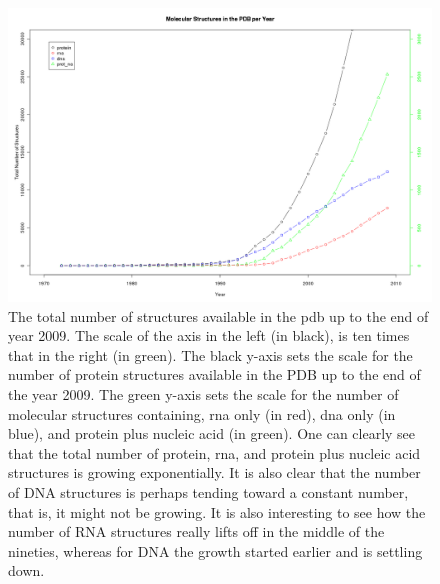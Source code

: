 \begin{figure}[t]
\centering
\includegraphics[angle=90, scale=0.5]{Supplement/allmolecules_per_year.png}
\caption{The total number of structures available in the pdb up to the
end of year 2009. The scale of the axis in the left (in black), is ten
times that in the right (in green). The black y-axis sets the scale
for the number of protein structures available in the PDB up to the
end of the year 2009. The green y-axis sets the scale for the number
of molecular structures containing, rna only (in red), dna only (in
blue), and protein plus nucleic acid (in green).
One can clearly see that the total number of protein, rna, and protein
plus nucleic acid structures is growing exponentially. It is also
clear that the number of DNA structures is perhaps tending toward a
constant number, that is, it might not be growing. It is also
interesting to see how the number of RNA structures really lifts off in the
middle of the nineties, whereas for DNA the growth started earlier and
is settling down.}
\label{fig:allpolypdb}
\end{figure}




